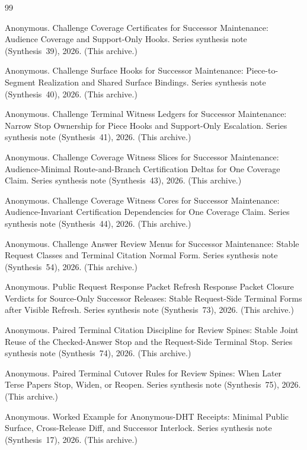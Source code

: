 \documentclass[11pt]{article}
\begin{document}
\begin{thebibliography}{99}\small

Anonymous.
\newblock Challenge Coverage Certificates for Successor Maintenance: Audience Coverage and Support-Only Hooks.
\newblock Series synthesis note (Synthesis~39), 2026. (This archive.)

Anonymous.
\newblock Challenge Surface Hooks for Successor Maintenance: Piece-to-Segment Realization and Shared Surface Bindings.
\newblock Series synthesis note (Synthesis~40), 2026. (This archive.)

Anonymous.
\newblock Challenge Terminal Witness Ledgers for Successor Maintenance: Narrow Stop Ownership for Piece Hooks and Support-Only Escalation.
\newblock Series synthesis note (Synthesis~41), 2026. (This archive.)

Anonymous.
\newblock Challenge Coverage Witness Slices for Successor Maintenance: Audience-Minimal Route-and-Branch Certification Deltas for One Coverage Claim.
\newblock Series synthesis note (Synthesis~43), 2026. (This archive.)

Anonymous.
\newblock Challenge Coverage Witness Cores for Successor Maintenance: Audience-Invariant Certification Dependencies for One Coverage Claim.
\newblock Series synthesis note (Synthesis~44), 2026. (This archive.)

Anonymous.
\newblock Challenge Answer Review Menus for Successor Maintenance: Stable Request Classes and Terminal Citation Normal Form.
\newblock Series synthesis note (Synthesis~54), 2026. (This archive.)

Anonymous.
\newblock Public Request Response Packet Refresh Response Packet Closure Verdicts for Source-Only Successor Releases: Stable Request-Side Terminal Forms after Visible Refresh.
\newblock Series synthesis note (Synthesis~73), 2026. (This archive.)

Anonymous.
\newblock Paired Terminal Citation Discipline for Review Spines: Stable Joint Reuse of the Checked-Answer Stop and the Request-Side Terminal Stop.
\newblock Series synthesis note (Synthesis~74), 2026. (This archive.)

Anonymous.
\newblock Paired Terminal Cutover Rules for Review Spines: When Later Terse Papers Stop, Widen, or Reopen.
\newblock Series synthesis note (Synthesis~75), 2026. (This archive.)

Anonymous.
\newblock Worked Example for Anonymous-DHT Receipts: Minimal Public Surface, Cross-Release Diff, and Successor Interlock.
\newblock Series synthesis note (Synthesis~17), 2026. (This archive.)

\end{thebibliography}
\end{document}
